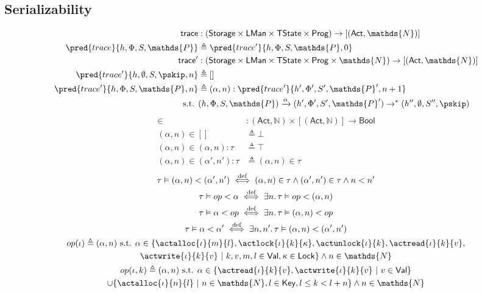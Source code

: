 \subsection{Serializability}

\begin{align*}
\mathsf{trace} &: (\mathsf{Storage} \times \mathsf{LMan} \times \mathsf{TState} \times \mathsf{Prog}) \rightarrow [(\mathsf{Act}, \mathds{N})] \\
\pred{trace}{h, \Phi, S, \mathds{P}} &\triangleq \pred{trace'}{h, \Phi, S, \mathds{P}, 0} \\
\mathsf{trace'} &: (\mathsf{Storage} \times \mathsf{LMan} \times \mathsf{TState} \times \mathsf{Prog} \times \mathds{N}) \rightarrow [(\mathsf{Act}, \mathds{N})] \\
\pred{trace'}{h, \emptyset, S, \pskip, n} &\triangleq [] \\
\pred{trace'}{h, \Phi, S, \mathds{P}, n} &\triangleq (\alpha, n) : \pred{trace'}{h', \Phi', S', \mathds{P}', n+ 1}
\\
\text{s.t. }& (h, \Phi, S, \mathds{P}) \xrightarrow{\alpha} (h', \Phi', S', \mathds{P}') \rightarrow^* (h'', \emptyset, S'', \pskip)
\end{align*}
\begin{align*}
\in &: (\mathsf{Act}, \mathds{N}) \times [(\mathsf{Act}, \mathds{N})] \rightarrow \mathsf{Bool} \\
(\alpha, n) \in [] &\triangleq \bot \\
(\alpha, n) \in (\alpha, n):\tau &\triangleq \top \\
(\alpha, n) \in (\alpha', n'):\tau &\triangleq (\alpha, n) \in \tau
\end{align*}
\begin{gather*}
\tau \vDash (\alpha, n) < (\alpha', n') \overset{\text{def}}{\iff}
(\alpha, n) \in \tau \land (\alpha', n') \in \tau \land n < n'
\\
\tau \vDash op < \alpha \overset{\text{def}}{\iff}
\exists n \ldotp \tau \vDash op < (\alpha, n)
\\
\tau \vDash \alpha < op \overset{\text{def}}{\iff}
\exists n \ldotp \tau \vDash (\alpha, n) < op
\\
\tau \vDash \alpha < \alpha' \overset{\text{def}}{\iff}
\exists n, n' \ldotp \tau \vDash (\alpha, n) < (\alpha', n')
\\
op(\iota) \triangleq (\alpha, n) \text{ s.t. } \alpha \in \{ \actalloc{\iota}{m}{l}, \actlock{\iota}{k}{\kappa}, \actunlock{\iota}{k}, \actread{\iota}{k}{v}, \\ \actwrite{\iota}{k}{v}\ |\ k, v, m, l \in \mathsf{Val}, \kappa \in \mathsf{Lock} \} \land n \in \mathds{N}
\\
op(\iota, k) \triangleq (\alpha, n) \text{ s.t. } \alpha \in \{ \actread{\iota}{k}{v}, \actwrite{\iota}{k}{v}\ |\ v \in \mathsf{Val} \} \\ \cup \{\actalloc{\iota}{n}{l}\ |\ n \in \mathds{N}, l \in \mathsf{Key}, l \leq k < l + n \} \land n \in \mathds{N}
\end{gather*}
